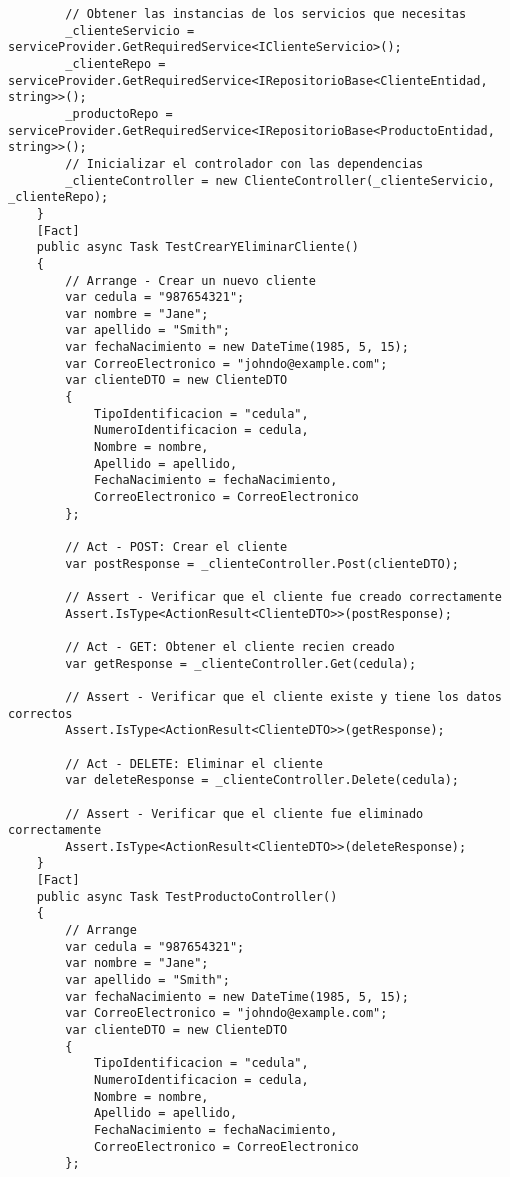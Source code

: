 \documentclass[executivepaper]{article}
\begin{document}
\begin{lstlisting}
        // Obtener las instancias de los servicios que necesitas
        _clienteServicio = serviceProvider.GetRequiredService<IClienteServicio>();
        _clienteRepo = serviceProvider.GetRequiredService<IRepositorioBase<ClienteEntidad, string>>();
        _productoRepo = serviceProvider.GetRequiredService<IRepositorioBase<ProductoEntidad, string>>();
        // Inicializar el controlador con las dependencias
        _clienteController = new ClienteController(_clienteServicio, _clienteRepo);
    }
    [Fact]
    public async Task TestCrearYEliminarCliente()
    {
        // Arrange - Crear un nuevo cliente
        var cedula = "987654321";
        var nombre = "Jane";
        var apellido = "Smith";
        var fechaNacimiento = new DateTime(1985, 5, 15);
        var CorreoElectronico = "johndo@example.com";
        var clienteDTO = new ClienteDTO
        {
            TipoIdentificacion = "cedula",
            NumeroIdentificacion = cedula,
            Nombre = nombre,
            Apellido = apellido,
            FechaNacimiento = fechaNacimiento,
            CorreoElectronico = CorreoElectronico
        };

        // Act - POST: Crear el cliente
        var postResponse = _clienteController.Post(clienteDTO);

        // Assert - Verificar que el cliente fue creado correctamente
        Assert.IsType<ActionResult<ClienteDTO>>(postResponse);

        // Act - GET: Obtener el cliente recien creado
        var getResponse = _clienteController.Get(cedula);

        // Assert - Verificar que el cliente existe y tiene los datos correctos
        Assert.IsType<ActionResult<ClienteDTO>>(getResponse);

        // Act - DELETE: Eliminar el cliente
        var deleteResponse = _clienteController.Delete(cedula);

        // Assert - Verificar que el cliente fue eliminado correctamente
        Assert.IsType<ActionResult<ClienteDTO>>(deleteResponse);
    }
    [Fact]
    public async Task TestProductoController()
    {
        // Arrange
        var cedula = "987654321";
        var nombre = "Jane";
        var apellido = "Smith";
        var fechaNacimiento = new DateTime(1985, 5, 15);
        var CorreoElectronico = "johndo@example.com";
        var clienteDTO = new ClienteDTO
        {
            TipoIdentificacion = "cedula",
            NumeroIdentificacion = cedula,
            Nombre = nombre,
            Apellido = apellido,
            FechaNacimiento = fechaNacimiento,
            CorreoElectronico = CorreoElectronico
        };


\end{lstlisting}
\end{document}
